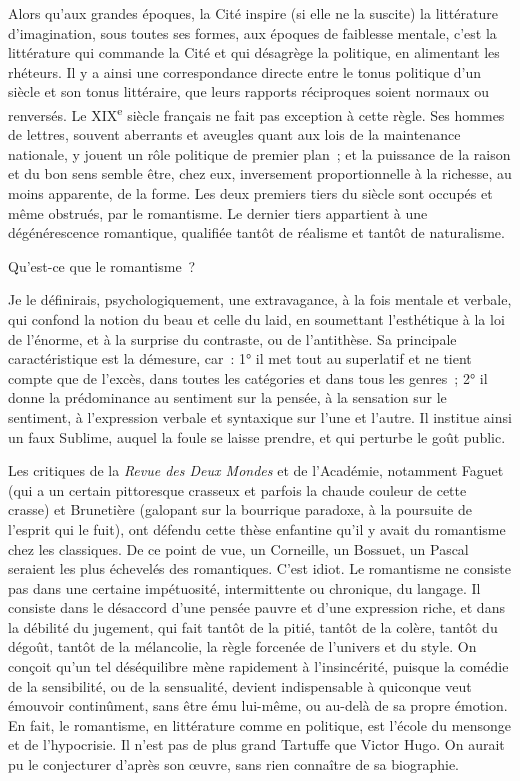 \documentclass[french,twoside]{book} %
\newcommand\chaptercont{} %
\begin{document}
\chaptercont
\noindent Alors qu’aux grandes époques, la Cité inspire (si elle ne la suscite) la littérature d’imagination, sous toutes ses formes, aux époques de faiblesse mentale, c’est la littérature qui commande la Cité et qui désagrège la politique, en alimentant les rhéteurs. Il y a ainsi une correspondance directe entre le tonus politique d’un siècle et son tonus littéraire, que leurs rapports réciproques soient normaux ou renversés. Le XIX\textsuperscript{e} siècle français ne fait pas exception à cette règle. Ses hommes de lettres, souvent aberrants et aveugles quant aux lois de la maintenance nationale, y jouent un rôle politique de premier plan ; et la puissance de la raison et du bon sens semble être, chez eux, inversement proportionnelle à la richesse, au moins apparente, de la forme. Les deux premiers tiers du siècle sont occupés et même obstrués, par le romantisme. Le dernier tiers appartient à une dégénérescence romantique, qualifiée tantôt de réalisme et tantôt de naturalisme.\par
Qu’est-ce que le romantisme ?\par
Je le définirais, psychologiquement, une extravagance, à la fois mentale et verbale, qui confond la notion du beau et celle du laid, en soumettant l’esthétique à la loi de l’énorme, et à la surprise du contraste, ou de l’antithèse. Sa principale caractéristique est la démesure, car : 1° il met tout au superlatif et ne tient compte que de l’excès, dans toutes les catégories et dans tous les genres ; 2° il donne la prédominance au sentiment sur la pensée, à la sensation sur le sentiment, à l’expression verbale et syntaxique sur l’une et l’autre. Il institue ainsi un faux Sublime, auquel la foule se laisse prendre, et qui perturbe le goût public.\par
Les critiques de la {\itshape Revue des Deux Mondes} et de l’Académie, notamment Faguet (qui a un certain pittoresque crasseux et parfois la chaude couleur de cette crasse) et Brunetière (galopant sur la bourrique paradoxe, à la poursuite de l’esprit qui le fuit), ont défendu cette thèse enfantine qu’il y avait du romantisme chez les classiques. De ce point de vue, un Corneille, un Bossuet, un Pascal seraient les plus échevelés des romantiques. C’est idiot. Le romantisme ne consiste pas dans une certaine impétuosité, intermittente ou chronique, du langage. Il consiste dans le désaccord d’une pensée pauvre et d’une expression riche, et dans la débilité du jugement, qui fait tantôt de la pitié, tantôt de la colère, tantôt du dégoût, tantôt de la mélancolie, la règle forcenée de l’univers et du style. On conçoit qu’un tel déséquilibre mène rapidement à l’insincérité, puisque la comédie de la sensibilité, ou de la sensualité, devient indispensable à quiconque veut émouvoir continûment, sans être ému lui-même, ou au-delà de sa propre émotion. En fait, le romantisme, en littérature comme en politique, est l’école du mensonge et de l’hypocrisie. Il n’est pas de plus grand Tartuffe que Victor Hugo. On aurait pu le conjecturer d’après son œuvre, sans rien connaître de sa biographie.\par
\end{document}
